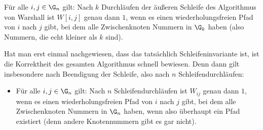 \begin{lemma}
  \label{lem:invariante-warshall}
  Für alle $i,j\in \G_n$ gilt: Nach $k$ Durchläufen der äußeren
  Schleife des Algorithmus von Warshall ist $W[i,j]$ genau dann $1$,
  wenn es einen wiederholungsfreien Pfad von $i$ nach $j$ gibt, bei
  dem alle Zwischenknoten Nummern in $\G_k$ haben (also Nummern, die
  echt kleiner als $k$ sind).
\end{lemma}
%
Hat man erst einmal nachgewiesen, dass das tatsächlich
Schleifeninvariante ist, ist die Korrektheit des gesamten Algorithmus
schnell bewiesen. Denn dann gilt insbesondere nach Beendigung der
Schleife, also nach $n$ Schleifendurchläufen:
\begin{itemize}
\item Für alle $i,j\in \G_n$ gilt: Nach $n$ Schleifendurchläufen ist
  $W_{ij}$ genau dann $1$, wenn es einen wiederholungsfreien Pfad von
  $i$ nach $j$ gibt, bei dem alle Zwischenknoten Nummern in $\G_n$
  haben, wenn also überhaupt ein Pfad existiert (denn andere
  Knotennummern gibt es gar nicht).
\end{itemize}

